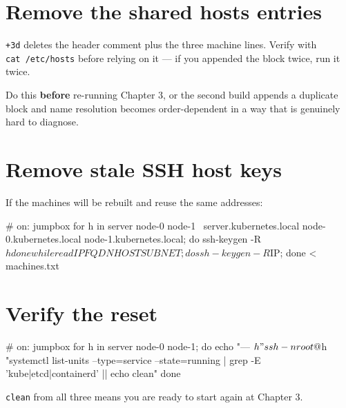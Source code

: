 \documentclass[11pt,oneside]{report}
\begin{document}
\hypertarget{remove-the-shared-hosts-entries}{%
\section{Remove the
shared hosts
entries}\label{remove-the-shared-hosts-entries}}


\texttt{+3d} deletes
the header comment
plus the three
machine lines.
Verify with
\texttt{cat\ /etc/hosts}
before relying on it
--- if you appended
the block twice, run
it twice.

Do this
\textbf{before}
re-running Chapter
3, or the second
build appends a
duplicate block and
name resolution
becomes
order-dependent in a
way that is
genuinely hard to
diagnose.

\hypertarget{remove-stale-ssh-host-keys}{%
\section{Remove
stale SSH host
keys}\label{remove-stale-ssh-host-keys}}

If the machines will
be rebuilt and reuse
the same addresses:

\begin{cmdlst}
# on: jumpbox
{
  for h in server node-0 node-1 \
           server.kubernetes.local node-0.kubernetes.local node-1.kubernetes.local; do
    ssh-keygen -R ${h}
  done
  while read IP FQDN HOST SUBNET; do ssh-keygen -R ${IP}; done < machines.txt
}
\end{cmdlst}

\hypertarget{verify-the-reset}{%
\section{Verify the
reset}\label{verify-the-reset}}

\begin{cmdlst}
# on: jumpbox
{
  for h in server node-0 node-1; do
    echo "--- ${h}"
    ssh -n root@${h} "systemctl list-units --type=service --state=running | grep -E 'kube|etcd|containerd' || echo clean"
  done
}
\end{cmdlst}

\texttt{clean} from
all three means you
are ready to start
again at Chapter 3.
\end{document}
